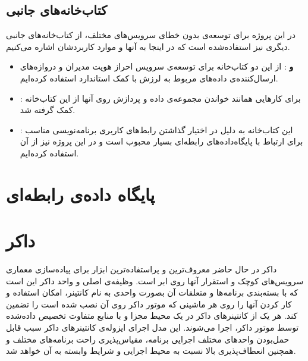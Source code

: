 \subsection{کتاب‌خانه‌‌های جانبی}
در این پروژه برای توسعه‌ی بدون خطای سرویس‌های مختلف، از کتاب‌خانه‌های جانبی دیگری نیز استفاده‌شده است که در اینجا به آنها و موارد کاربردشان اشاره می‌کنیم.
\begin{itemize}

\item \textbf{ و }: از این دو کتاب‌خانه برای توسعه‌ی سرویس احراز هویت مدیران و دروازه‌های ارسال‌کننده‌ی داده‌های مربوط به لرزش با کمک استاندارد  استفاده کرده‌ایم.

\item \textbf{}: برای کارهایی همانند خواندن مجموعه‌ی داده و پردازش روی آنها از این کتاب‌خانه کمک گرفته شد.

\item \textbf{}: این کتاب‌خانه به دلیل در اختیار گذاشتن رابط‌های کاربری برنامه‌نویسی مناسب برای ارتباط با پایگاه‌داده‌های رابطه‌ای بسیار محبوب است و در این پروژه نیز از آن استفاده کرده‌ایم.

\end{itemize}


\section{پایگاه داده‌ی رابطه‌ای}


\section{داکر}
داکر در حال حاضر معروف‌ترین و پراستفاده‌ترین ابزار برای پیاده‌سازی معماری سرویس‌های کوچک و استقرار آنها روی ابر است.  وظیفه‌ی اصلی و واحد داکر این است که با بسته‌بندی برنامه‌ها و متعلقات آن بصورت واحدی به نام کانتینر، امکان استفاده و کار کردن آنها را روی هر ماشینی که موتور داکر روی آن نصب شده است را تضمین کند. هر یک از کانتینرهای داکر در یک محیط مجزا و با منابع متفاوت تخصیص داده‌شده توسط موتور داکر، اجرا می‌شوند. این مدل اجرای ایزوله‌ی کانتینرهای داکر سبب قابل حمل‌بودن واحدهای مختلف اجرایی برنامه، مقیاس‌پذیری راحت برنامه‌های مختلف و همچنین انعطاف‌پذیری بالا نسبت به محیط اجرایی و شرایط وابسته به آن خواهد شد\cite{anderson2015docker, dockerDockerOverview}.

